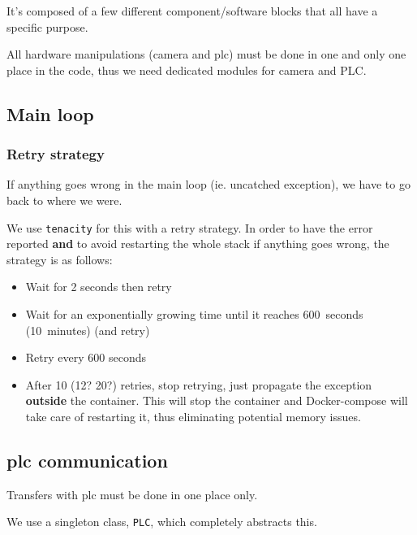 It's composed of a few different component/software blocks that all have a specific purpose.

All hardware manipulations (camera and \gls{plc}) must be done in one and only one place in the code,
thus we need dedicated modules for camera and PLC.


\subsection{Main loop}


\subsubsection{Retry strategy}

If anything goes wrong in the main loop (ie. uncatched exception), we have to go back to where we were.

We use \texttt{tenacity} for this with a retry strategy. In order to have the error reported \textbf{and}
to avoid restarting the whole stack if anything goes wrong, the strategy is as follows:

\begin{itemize}
    \item Wait for 2 seconds then retry
    \item Wait for an exponentially growing time until it reaches 600~seconds (10~minutes) (and retry)
    \item Retry every 600 seconds
    \item After 10 (12? 20?) retries, stop retrying, just propagate the exception \textbf{outside} the container.
        This will stop the container and Docker-compose will take care of restarting it, thus eliminating
        potential memory issues.
\end{itemize}


\subsection{\gls{plc} communication}

Transfers with \gls{plc} must be done in one place only.

We use a singleton class, \texttt{PLC}, which completely abstracts this.


